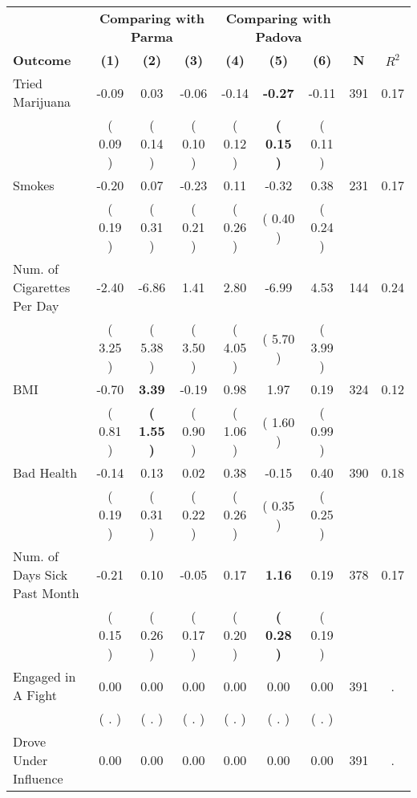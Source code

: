\begin{tabular}{lcccccccc}
\toprule
 & \multicolumn{3}{c}{\textbf{Comparing with Parma}} & \multicolumn{3}{c}{\textbf{Comparing with Padova}} & \\
\cmidrule(lr){2-4} \cmidrule(lr){5-7} 
 \textbf{Outcome} & \textbf{(1)} & \textbf{(2)} & \textbf{(3)} & \textbf{(4)} & \textbf{(5)} & \textbf{(6)} & \textbf{N} & \textbf{$ R^2$} \\
\midrule
Tried Marijuana &     -0.09 &      0.03 &     -0.06 &     -0.14 & \textbf{    -0.27} &     -0.11 & 391 &       0.17 \\ 
 & (     0.09 ) & (     0.14 ) & (     0.10 ) & (     0.12 ) & \textbf{(     0.15 )} & (     0.11 ) & \\
Smokes &     -0.20 &      0.07 &     -0.23 &      0.11 &     -0.32 &      0.38 & 231 &       0.17 \\ 
 & (     0.19 ) & (     0.31 ) & (     0.21 ) & (     0.26 ) & (     0.40 ) & (     0.24 ) & \\
Num. of Cigarettes Per Day &     -2.40 &     -6.86 &      1.41 &      2.80 &     -6.99 &      4.53 & 144 &       0.24 \\ 
 & (     3.25 ) & (     5.38 ) & (     3.50 ) & (     4.05 ) & (     5.70 ) & (     3.99 ) & \\
BMI &     -0.70 & \textbf{     3.39} &     -0.19 &      0.98 &      1.97 &      0.19 & 324 &       0.12 \\ 
 & (     0.81 ) & \textbf{(     1.55 )} & (     0.90 ) & (     1.06 ) & (     1.60 ) & (     0.99 ) & \\
Bad Health &     -0.14 &      0.13 &      0.02 &      0.38 &     -0.15 &      0.40 & 390 &       0.18 \\ 
 & (     0.19 ) & (     0.31 ) & (     0.22 ) & (     0.26 ) & (     0.35 ) & (     0.25 ) & \\
Num. of Days Sick Past Month &     -0.21 &      0.10 &     -0.05 &      0.17 & \textbf{     1.16} &      0.19 & 378 &       0.17 \\ 
 & (     0.15 ) & (     0.26 ) & (     0.17 ) & (     0.20 ) & \textbf{(     0.28 )} & (     0.19 ) & \\
Engaged in A Fight &      0.00 &      0.00 &      0.00 &      0.00 &      0.00 &      0.00 & 391 &          . \\ 
 & (        . ) & (        . ) & (        . ) & (        . ) & (        . ) & (        . ) & \\
Drove Under Influence &      0.00 &      0.00 &      0.00 &      0.00 &      0.00 &      0.00 & 391 &          . \\ 

\end{tabular}

